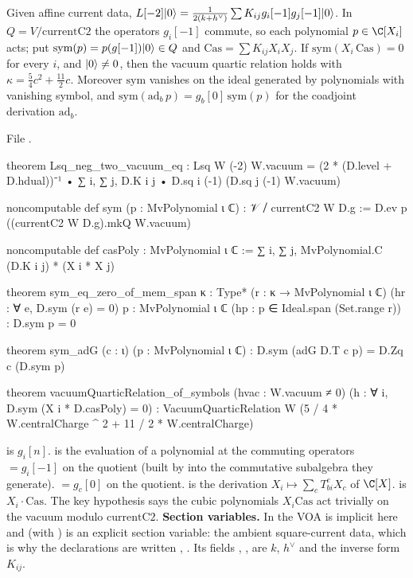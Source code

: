 \begin{theorem}\label{l25:thm:symbols}
Given affine current data, $L[-2]|0\rangle=\frac{1}{2(k+h^\vee)}\sum K_{ij}g_i[-1]g_j[-1]|0\rangle$. In
$Q=V/\mathrm{currentC2}$ the operators $g_i[-1]$ commute, so each polynomial $p\in\C[X_i]$ acts; put
$\mathrm{sym}(p)=p(g[-1])|0\rangle\in Q$ and $\mathrm{Cas}=\sum K_{ij}X_iX_j$. If $\mathrm{sym}(X_i\,\mathrm{Cas})=0$
for every $i$, and $|0\rangle\ne0$, then the vacuum quartic relation holds with $\kappa=\frac54c^2+\frac{11}2c$.
Moreover $\mathrm{sym}$ vanishes on the ideal generated by polynomials with vanishing symbol, and
$\mathrm{sym}(\mathrm{ad}_b\,p)=g_b[0]\,\mathrm{sym}(p)$ for the coadjoint derivation $\mathrm{ad}_b$.
\end{theorem}
\noindent File .
\begin{leancode}
theorem Lsq_neg_two_vacuum_eq :
    Lsq W (-2) W.vacuum = (2 * (D.level + D.hdual))⁻¹ •
      ∑ i, ∑ j, D.K i j • D.sq i (-1) (D.sq j (-1) W.vacuum)

noncomputable def sym (p : MvPolynomial ι ℂ) : 𝒱 ⧸ currentC2 W D.g :=
  D.ev p ((currentC2 W D.g).mkQ W.vacuum)

noncomputable def casPoly : MvPolynomial ι ℂ :=
  ∑ i, ∑ j, MvPolynomial.C (D.K i j) * (X i * X j)

theorem sym_eq_zero_of_mem_span {κ : Type*} (r : κ → MvPolynomial ι ℂ)
    (hr : ∀ e, D.sym (r e) = 0) {p : MvPolynomial ι ℂ} (hp : p ∈ Ideal.span (Set.range r)) :
    D.sym p = 0

theorem sym_adG (c : ι) (p : MvPolynomial ι ℂ) : D.sym (adG D.T c p) = D.Zq c (D.sym p)

theorem vacuumQuarticRelation_of_symbols (hvac : W.vacuum ≠ 0)
    (h : ∀ i, D.sym (X i * D.casPoly) = 0) :
    VacuumQuarticRelation W (5 / 4 * W.centralCharge ^ 2 + 11 / 2 * W.centralCharge)
\end{leancode}
\begin{dictionary}
 is $g_i[n]$.  is the evaluation of a polynomial at the commuting operators
 $=g_i[-1]$ on the quotient (built by  into the commutative subalgebra they
generate).  $=g_c[0]$ on the quotient.  is the derivation $X_i\mapsto\sum_cT_{bi}^cX_c$ of
$\C[X]$.  is $X_i\cdot\mathrm{Cas}$. The key hypothesis says the cubic polynomials
$X_i\mathrm{Cas}$ act trivially on the vacuum modulo $\mathrm{currentC2}$. \textbf{Section variables.} In
 the VOA  is implicit here and
 (with \lean{[Fintype ι]}) is an explicit section variable: the ambient square-current data,
which is why the declarations are written , . Its fields , ,
 are $k$, $h^\vee$ and the inverse form $K_{ij}$.
\end{dictionary}
